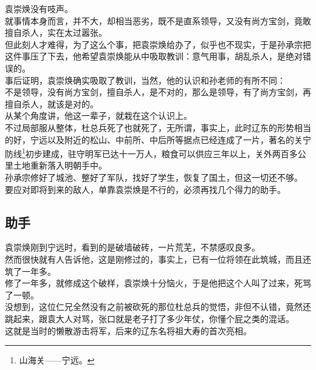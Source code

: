 \begin{multicols}{\theparacolNo}
袁崇焕没有吱声。\\

就事情本身而言，并不大，却相当恶劣，既不是直系领导，又没有尚方宝剑，竟敢擅自杀人，实在太过嚣张。\\

但此刻人才难得，为了这么个事，把袁崇焕给办了，似乎也不现实，于是孙承宗把这件事压了下去，他希望袁崇焕能从中吸取教训：意气用事，胡乱杀人，是绝对错误的。\\

事后证明，袁崇焕确实吸取了教训，当然，他的认识和孙老师的有所不同：\\

不是领导，没有尚方宝剑，擅自杀人，是不对的，那么是领导，有了尚方宝剑，再擅自杀人，就该是对的。\\

从某个角度讲，他这一辈子，就栽在这个认识上。\\

不过局部服从整体，杜总兵死了也就死了，无所谓，事实上，此时辽东的形势相当的好，宁远以及附近的松山、中前所、中后所等据点已经连成了一片，著名的关宁防线\footnote{山海关——宁远。}初步建成，驻守明军已达十一万人，粮食可以供应三年以上，关外两百多公里土地重新落入明朝手中。\\

孙承宗修好了城池、整好了军队，找好了学生，恢复了国土，但这一切还不够。\\

要应对即将到来的敌人，单靠袁崇焕是不行的，必须再找几个得力的助手。\\

\subsection{助手}
袁崇焕刚到宁远时，看到的是破墙破砖，一片荒芜，不禁感叹良多。\\

然而很快就有人告诉他，这是刚修过的，事实上，已有一位将领在此筑城，而且还筑了一年多。\\

修了一年多，就修成这个破样，袁崇焕十分恼火，于是他把这个人叫了过来，死骂了一顿。\\

没想到，这位仁兄全然没有之前被砍死的那位杜总兵的觉悟，非但不认错，竟然还跳起来，跟袁大人对骂，张口就是老子打了多少年仗，你懂个屁之类的混话。\\

这就是当时的懒散游击将军，后来的辽东名将祖大寿的首次亮相。\\


\end{multicols}
